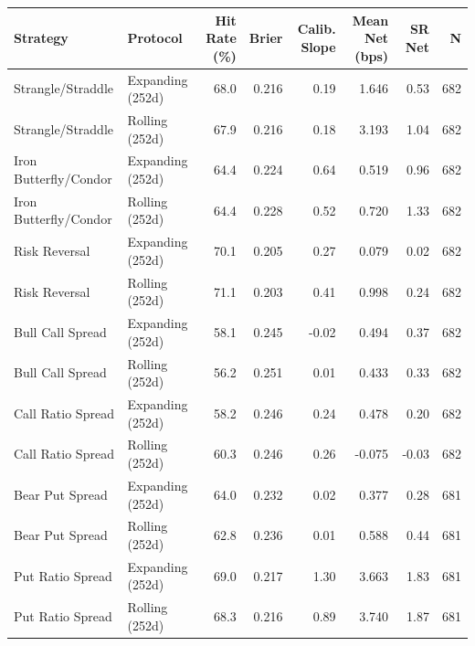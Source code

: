 \begin{tabular}{llrrrrrr}
\toprule
Strategy & Protocol & Hit Rate (\%) & Brier & Calib. Slope & Mean Net (bps) & SR Net & N \\
\midrule
Strangle/Straddle & Expanding (252d) & 68.0 & 0.216 & 0.19 & 1.646 & 0.53 & 682 \\
Strangle/Straddle & Rolling (252d) & 67.9 & 0.216 & 0.18 & 3.193 & 1.04 & 682 \\
Iron Butterfly/Condor & Expanding (252d) & 64.4 & 0.224 & 0.64 & 0.519 & 0.96 & 682 \\
Iron Butterfly/Condor & Rolling (252d) & 64.4 & 0.228 & 0.52 & 0.720 & 1.33 & 682 \\
Risk Reversal & Expanding (252d) & 70.1 & 0.205 & 0.27 & 0.079 & 0.02 & 682 \\
Risk Reversal & Rolling (252d) & 71.1 & 0.203 & 0.41 & 0.998 & 0.24 & 682 \\
Bull Call Spread & Expanding (252d) & 58.1 & 0.245 & -0.02 & 0.494 & 0.37 & 682 \\
Bull Call Spread & Rolling (252d) & 56.2 & 0.251 & 0.01 & 0.433 & 0.33 & 682 \\
Call Ratio Spread & Expanding (252d) & 58.2 & 0.246 & 0.24 & 0.478 & 0.20 & 682 \\
Call Ratio Spread & Rolling (252d) & 60.3 & 0.246 & 0.26 & -0.075 & -0.03 & 682 \\
Bear Put Spread & Expanding (252d) & 64.0 & 0.232 & 0.02 & 0.377 & 0.28 & 681 \\
Bear Put Spread & Rolling (252d) & 62.8 & 0.236 & 0.01 & 0.588 & 0.44 & 681 \\
Put Ratio Spread & Expanding (252d) & 69.0 & 0.217 & 1.30 & 3.663 & 1.83 & 681 \\
Put Ratio Spread & Rolling (252d) & 68.3 & 0.216 & 0.89 & 3.740 & 1.87 & 681 \\
\bottomrule
\end{tabular}
